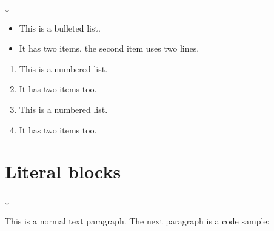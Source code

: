 \documentclass[letterpaper,10pt,dvipdfmx,openany,oneside]{sphinxmanual}
\begin{document}
↓
\begin{itemize}
\item {} 
This is a bulleted list.

\item {} 
It has two items, the second
item uses two lines.

\end{itemize}
\begin{enumerate}
\item {} 
This is a numbered list.

\item {} 
It has two items too.

\item {} 
This is a numbered list.

\item {} 
It has two items too.

\end{enumerate}


\section{Literal blocks}
\label{\detokenize{source/1.chapter/basic_syntax:literal-blocks}}
%
\begin{sphinxVerbatim}[commandchars=\\\{\}]
            

          
       

       

      
\end{sphinxVerbatim}

↓

This is a normal text paragraph. The next paragraph is a code sample:

%
\begin{sphinxVerbatim}[commandchars=\\\{\}]
       
    

    
\end{sphinxVerbatim}
\end{document}
